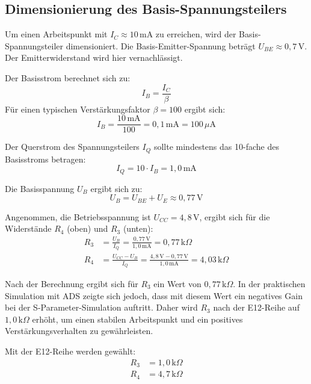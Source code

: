 \subsection*{Dimensionierung des Basis-Spannungsteilers}

Um einen Arbeitspunkt mit $I_C \approx 10\,\mathrm{mA}$ zu erreichen, wird der Basis-Spannungsteiler dimensioniert. Die Basis-Emitter-Spannung beträgt $U_{BE} \approx 0{,}7\,\mathrm{V}$. Der Emitterwiderstand wird hier vernachlässigt.

Der Basisstrom berechnet sich zu:
\begin{equation}
    I_B = \frac{I_C}{\beta}
\end{equation}
Für einen typischen Verstärkungsfaktor $\beta = 100$ ergibt sich:
\begin{equation}
    I_B = \frac{10\,\mathrm{mA}}{100} = 0{,}1\,\mathrm{mA} = 100\,\mu\mathrm{A}
\end{equation}

Der Querstrom des Spannungsteilers $I_Q$ sollte mindestens das 10-fache des Basisstroms betragen:
\begin{equation}
    I_Q = 10 \cdot I_B = 1{,}0\,\mathrm{mA}
\end{equation}

Die Basisspannung $U_B$ ergibt sich zu:
\begin{equation}
    U_B = U_{BE} + U_E \approx 0{,}77\,\mathrm{V}
\end{equation}

Angenommen, die Betriebsspannung ist $U_{CC} = 4{,}8\,\mathrm{V}$, ergibt sich für die Widerstände $R_4$ (oben) und $R_3$ (unten):
\begin{align}
    R_3 &= \frac{U_B}{I_Q} = \frac{0{,}77\,\mathrm{V}}{1{,}0\,\mathrm{mA}} = 0{,}77\,\mathrm{k}\Omega \\
    R_4 &= \frac{U_{CC} - U_B}{I_Q} = \frac{4{,}8\,\mathrm{V} - 0{,}77\,\mathrm{V}}{1{,}0\,\mathrm{mA}} = 4{,}03\,\mathrm{k}\Omega
\end{align}

Nach der Berechnung ergibt sich für $R_3$ ein Wert von $0{,}77\,\mathrm{k}\Omega$. In der praktischen Simulation mit ADS zeigte sich jedoch, dass mit diesem Wert ein negatives Gain bei der S-Parameter-Simulation auftritt. Daher wird $R_3$ nach der E12-Reihe auf $1{,}0\,\mathrm{k}\Omega$ erhöht, um einen stabilen Arbeitspunkt und ein positives Verstärkungsverhalten zu gewährleisten.

Mit der E12-Reihe werden gewählt:
\begin{align*}
    R_3 &= 1{,}0\,\mathrm{k}\Omega \\
    R_4 &= 4{,}7\,\mathrm{k}\Omega
\end{align*}


